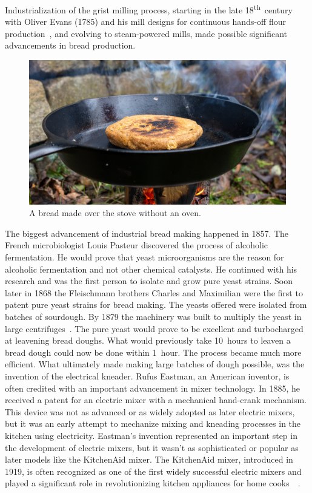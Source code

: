 Industrialization of the grist milling process, starting in the late
18\textsuperscript{th}~century with Oliver Evans (\num{1785}) and his mill
designs for continuous hands-off flour production~\cite{evans+mill}, and
evolving to steam-powered mills, made possible significant advancements in
bread production.

\begin{figure}[ht]
  \centering
  \includegraphics[width=\textwidth]{sourdough-stove}
  \caption{A bread made over the stove without an oven.}%
  \label{fig:sourdough-stove}
\end{figure}

The biggest advancement of industrial bread making happened in \num{1857}.
The French microbiologist Louis Pasteur discovered the process of alcoholic
fermentation. He would prove that yeast microorganisms are the reason for
alcoholic fermentation and not other chemical catalysts. He continued with his
research and was the first person to isolate and grow pure yeast strains.
Soon later in \num{1868} the Fleischmann brothers Charles and Maximilian were
the first to patent pure yeast strains for bread making. The yeasts offered
were isolated from batches of sourdough. By \num{1879} the machinery was built
to multiply the yeast in large centrifuges~\cite{fleischmann+history}.  The
pure yeast would prove to be excellent and turbocharged at leavening bread
doughs. What would previously take 10~hours to leaven a bread dough could now
be done within 1~hour.  The process became much more efficient. What
ultimately made making large batches of dough possible, was the invention of
the electrical kneader.  Rufus Eastman, an American inventor, is often
credited with an important advancement in mixer technology. In \num{1885}, he
received a patent for an electric mixer with a mechanical hand-crank
mechanism.  This device was not as advanced or as widely adopted as later
electric mixers, but it was an early attempt to mechanize mixing and kneading
processes in the kitchen using electricity.  Eastman's invention represented
an important step in the development of electric mixers, but it wasn't as
sophisticated or popular as later models like the KitchenAid mixer. The
KitchenAid mixer, introduced in \num{1919}, is often recognized as one of the
first widely successful electric mixers and played a significant role in
revolutionizing kitchen appliances for home
cooks~\cite{first+mixer}~\cite{kitchenaid+history}.

